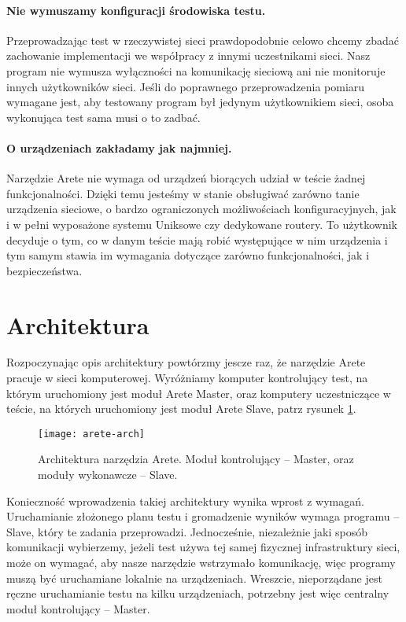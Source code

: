 \documentclass[00-praca-magisterska.tex]{subfiles}
\begin{document}
\paragraph{Nie wymuszamy konfiguracji środowiska testu.} Przeprowadzając test w
rzeczywistej sieci prawdopodobnie celowo chcemy zbadać zachowanie implementacji
we współpracy z innymi uczestnikami sieci. Nasz program nie wymusza wyłączności
na komunikację sieciową ani nie monitoruje innych użytkowników sieci. Jeśli do
poprawnego przeprowadzenia pomiaru wymagane jest, aby testowany program był
jedynym użytkownikiem sieci, osoba wykonująca test sama musi o to zadbać.

\paragraph{O urządzeniach zakładamy jak najmniej.} Narzędzie Arete nie
wymaga od urządzeń biorących udział w teście żadnej funkcjonalności.
Dzięki temu jesteśmy w stanie obsługiwać zarówno tanie urządzenia sieciowe, o
bardzo ograniczonych możliwościach konfiguracyjnych, jak i w pełni wyposażone
systemu Uniksowe czy dedykowane routery. To użytkownik decyduje o tym, co w
danym teście mają robić występujące w nim urządzenia i tym samym stawia
im wymagania dotyczące zarówno funkcjonalności, jak i bezpieczeństwa.

\section{Architektura}

Rozpoczynając opis architektury powtórzmy jescze raz, że narzędzie Arete
pracuje w sieci komputerowej. Wyróżniamy komputer kontrolujący test, na którym
uruchomiony jest moduł Arete Master, oraz komputery uczestniczące w teście, na
których uruchomiony jest moduł Arete Slave, patrz rysunek \ref{fig:arete-arch}.

\begin{figure}
\begin{center}
\leavevmode
\texttt{[image: arete-arch]}
\end{center}
\caption{Architektura narzędzia Arete. Moduł kontrolujący -- Master, oraz
moduły wykonawcze -- Slave.}
\label{fig:arete-arch}
\end{figure}

Konieczność wprowadzenia takiej architektury wynika wprost z wymagań.
Uruchamianie złożonego planu testu i gromadzenie wyników wymaga programu --
Slave, który te zadania przeprowadzi. Jednocześnie, niezależnie jaki sposób
komunikacji wybierzemy, jeżeli test używa tej samej fizycznej infrastruktury
sieci, może on wymagać, aby nasze narzędzie wstrzymało komunikację, więc
programy muszą być uruchamiane lokalnie na urządzeniach. Wreszcie,
nieporządane jest ręczne uruchamianie testu na kilku urządzeniach, potrzebny
jest więc centralny moduł kontrolujący -- Master.
\end{document}
